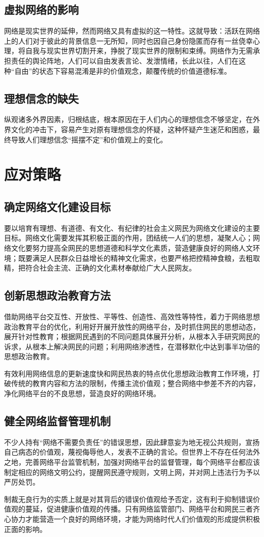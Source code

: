 \documentclass[UTF8]{ctexart}
\begin{document}
	\subsection{虚拟网络的影响}
	网络是现实世界的延伸，然而网络又具有虚拟的这一特性。这就导致：活跃在网络上的人们对于彼此的背景信息一无所知，同时也因自己身份隐匿而存有一丝侥幸心理，将自我与现实世界切割开来，挣脱了现实世界的限制和束缚。网络作为无需承担责任的舆论阵地，人们可以自由发表言论、发泄情绪，长此以往，人们在这种“自由”的状态下容易混淆是非的价值观念，颠覆传统的价值道德标准\cite{LJY}。
	\subsection{理想信念的缺失}
	纵观诸多外界因素，归根结底，根本原因在于人们内心的理想信念不够坚定，在外界文化的冲击下，容易产生对原有理想信念的怀疑，这种怀疑产生迷茫和困惑，最终导致人们理想信念“摇摆不定”和价值观上的变化。
\section{应对策略}
	\subsection{确定网络文化建设目标}
	要以培育有理想、有道德、有文化、有纪律的社会主义网民为网络文化建设的主要目标\cite{MST}。网络文化需要发挥其积极正面的作用，团结统一人们的思想，凝聚人心；网络文化要努力提高全网民的思想道德和科学文化素质，营造健康良好的网络人文环境；既要满足人民群众日益增长的精神文化需求，也要严格把控精神食粮，去粗取精，把符合社会主流、正确的文化素材奉献给广大人民网友。
	\subsection{创新思想政治教育方法}
	借助网络平台交互性、开放性、平等性、创造性、高效性等特性\cite{YWG}，着力于网络思想政治教育平台的优化，利用好开展开放性的网络平台，及时抓住网民的思想动态，展开针对性教育；根据网民遇到的不同问题具体展开分析，从根本入手研究网民的诉求，从根本上解决网民的问题；利用网络渗透性，在潜移默化中达到事半功倍的思想政治教育\cite{LYX}。
	\par{有效利用网络信息的更新速度快和网民热衷的特点优化思想政治教育工作环境，打破传统的教育内容和方法的限制，传播主流价值观；整合网络中参差不齐的内容，净化网络平台的不良思想，营造良好的网络环境。}
	\subsection{健全网络监督管理机制}
	不少人持有“网络不需要负责任”的错误思想，因此肆意妄为地无视公共规则，宣扬自己病态的价值观，蔑视侮辱他人，发表不正确的言论。但世界上不存在任何法外之地，完善网络平台监管机制，加强对网络平台的监督管理，每个网络平台都应该制定相应的网络文明公约，提醒网民遵守规则，文明上网，并对网上违法行为予以严厉处罚。
	\par{制裁无良行为的实质上就是对其背后的错误价值观给予否定，这有利于抑制错误价值观的蔓延，促进健康价值观的传播。只有网络监管部门、网络平台和网民三者齐心协力才能营造一个良好的网络环境，才能为网络时代人们价值观的形成提供积极正面的影响。\cite{HZF}}
	


\end{document}
